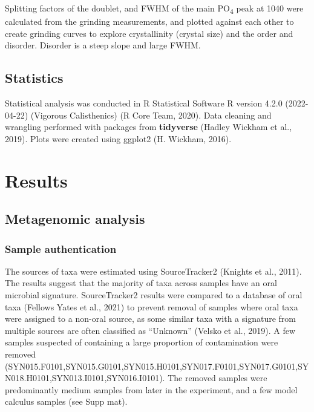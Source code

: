 \documentclass[
]{article}
\begin{document}
Splitting factors of the doublet, and FWHM of the main
PO\textsubscript{4} peak at 1040 were calculated from the grinding
measurements, and plotted against each other to create grinding curves
to explore crystallinity (crystal size) and the order and disorder.
Disorder is a steep slope and large FWHM.

\hypertarget{statistics}{%
\subsection{Statistics}\label{statistics}}

Statistical analysis was conducted in R Statistical Software R version
4.2.0 (2022-04-22) (Vigorous Calisthenics) (R Core Team, 2020). Data
cleaning and wrangling performed with packages from \textbf{tidyverse}
(Hadley Wickham et al., 2019). Plots were created using ggplot2 (H.
Wickham, 2016).

\hypertarget{results}{%
\section{Results}\label{results}}

\hypertarget{metagenomic-analysis}{%
\subsection{Metagenomic analysis}\label{metagenomic-analysis}}

\hypertarget{sample-authentication}{%
\subsubsection{Sample authentication}\label{sample-authentication}}

The sources of taxa were estimated using SourceTracker2 (Knights et al.,
2011). The results suggest that the majority of taxa across samples have
an oral microbial signature. SourceTracker2 results were compared to a
database of oral taxa (Fellows Yates et al., 2021) to prevent removal of
samples where oral taxa were assigned to a non-oral source, as some
similar taxa with a signature from multiple sources are often classified
as ``Unknown'' (Velsko et al., 2019). A few samples suspected of
containing a large proportion of contamination were removed
(SYN015.F0101,SYN015.G0101,SYN015.H0101,SYN017.F0101,SYN017.G0101,SYN018.H0101,SYN013.I0101,SYN016.I0101).
The removed samples were predominantly medium samples from later in the
experiment, and a few model calculus samples (see Supp mat).
\end{document}
